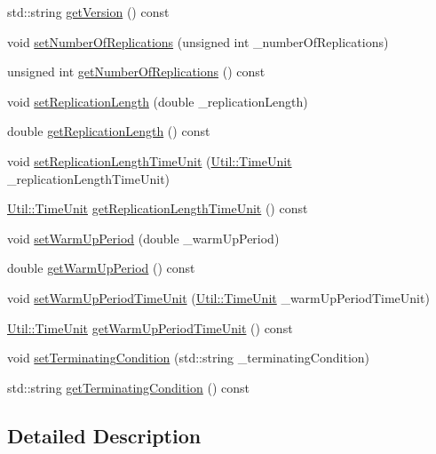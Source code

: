 \begin{DoxyCompactItemize}
std\-::string \hyperlink{class_model_info_a3edf40723a25ac5e48f687f61edfd831}{get\-Version} () const 
\item 
void \hyperlink{class_model_info_a72330fba06aa1ccff933b52ead028154}{set\-Number\-Of\-Replications} (unsigned int \-\_\-number\-Of\-Replications)
\item 
unsigned int \hyperlink{class_model_info_a66d8ae9376d62d74ea770d9e88e1bd89}{get\-Number\-Of\-Replications} () const 
\item 
void \hyperlink{class_model_info_a1566fe70905b1fe7fe1e092f139917bd}{set\-Replication\-Length} (double \-\_\-replication\-Length)
\item 
double \hyperlink{class_model_info_ab3d0f7e09c769b410618f99404b1eb4c}{get\-Replication\-Length} () const 
\item 
void \hyperlink{class_model_info_a9e0e1dd5f3fcee6d16c249451d0910ab}{set\-Replication\-Length\-Time\-Unit} (\hyperlink{class_util_a28504cc2fecc9aa47154cba4e625ec6f}{Util\-::\-Time\-Unit} \-\_\-replication\-Length\-Time\-Unit)
\item 
\hyperlink{class_util_a28504cc2fecc9aa47154cba4e625ec6f}{Util\-::\-Time\-Unit} \hyperlink{class_model_info_a4a6537a0fde41408839c7070f3d8f2b5}{get\-Replication\-Length\-Time\-Unit} () const 
\item 
void \hyperlink{class_model_info_ae3d5ebac01faed3db5e5e7fb54acc994}{set\-Warm\-Up\-Period} (double \-\_\-warm\-Up\-Period)
\item 
double \hyperlink{class_model_info_acdbb7b038db5c12d7b5e8e19674a778e}{get\-Warm\-Up\-Period} () const 
\item 
void \hyperlink{class_model_info_a24c120cce9ea134d6c9d1a2558866b30}{set\-Warm\-Up\-Period\-Time\-Unit} (\hyperlink{class_util_a28504cc2fecc9aa47154cba4e625ec6f}{Util\-::\-Time\-Unit} \-\_\-warm\-Up\-Period\-Time\-Unit)
\item 
\hyperlink{class_util_a28504cc2fecc9aa47154cba4e625ec6f}{Util\-::\-Time\-Unit} \hyperlink{class_model_info_adec436c79560bbfa5ec4e2bc21ae0450}{get\-Warm\-Up\-Period\-Time\-Unit} () const 
\item 
void \hyperlink{class_model_info_a4cb06dd9c3aeb8856ad50122714aa167}{set\-Terminating\-Condition} (std\-::string \-\_\-terminating\-Condition)
\item 
std\-::string \hyperlink{class_model_info_a31137229cc0de318e238bc9f18f021e2}{get\-Terminating\-Condition} () const 
\end{DoxyCompactItemize}


\subsection{Detailed Description}


